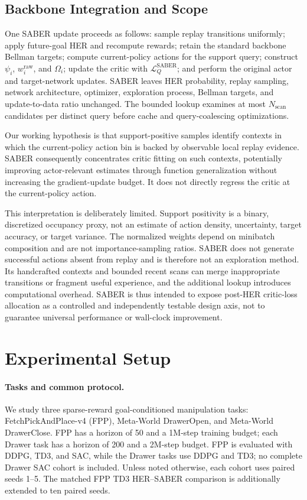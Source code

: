 \documentclass[letterpaper]{article}
\begin{document}
\subsection{Backbone Integration and Scope}

One SABER update proceeds as follows: sample replay transitions uniformly; apply future-goal HER and recompute rewards; retain the standard backbone Bellman targets; compute current-policy actions for the support query; construct \(\psi_i\), \(w_i^{\mathrm{raw}}\), and \(\Omega_i\); update the critic with \(\mathcal{L}_{Q}^{\mathrm{SABER}}\); and perform the original actor and target-network updates. SABER leaves HER probability, replay sampling, network architecture, optimizer, exploration process, Bellman targets, and update-to-data ratio unchanged. The bounded lookup examines at most \(N_{\mathrm{scan}}\) candidates per distinct query before cache and query-coalescing optimizations.

Our working hypothesis is that support-positive samples identify contexts in which the current-policy action bin is backed by observable local replay evidence. SABER consequently concentrates critic fitting on such contexts, potentially improving actor-relevant estimates through function generalization without increasing the gradient-update budget. It does not directly regress the critic at the current-policy action.

This interpretation is deliberately limited. Support positivity is a binary, discretized occupancy proxy, not an estimate of action density, uncertainty, target accuracy, or target variance. The normalized weights depend on minibatch composition and are not importance-sampling ratios. SABER does not generate successful actions absent from replay and is therefore not an exploration method. Its handcrafted contexts and bounded recent scans can merge inappropriate transitions or fragment useful experience, and the additional lookup introduces computational overhead. SABER is thus intended to expose post-HER critic-loss allocation as a controlled and independently testable design axis, not to guarantee universal performance or wall-clock improvement.

\section{Experimental Setup}

\paragraph{Tasks and common protocol.}
We study three sparse-reward goal-conditioned manipulation tasks: FetchPickAndPlace-v4 (FPP), Meta-World DrawerOpen, and Meta-World DrawerClose. FPP has a horizon of 50 and a 1M-step training budget; each Drawer task has a horizon of 200 and a 2M-step budget. FPP is evaluated with DDPG, TD3, and SAC, while the Drawer tasks use DDPG and TD3; no complete Drawer SAC cohort is included. Unless noted otherwise, each cohort uses paired seeds 1--5. The matched FPP TD3 HER--SABER comparison is additionally extended to ten paired seeds.
\end{document}
